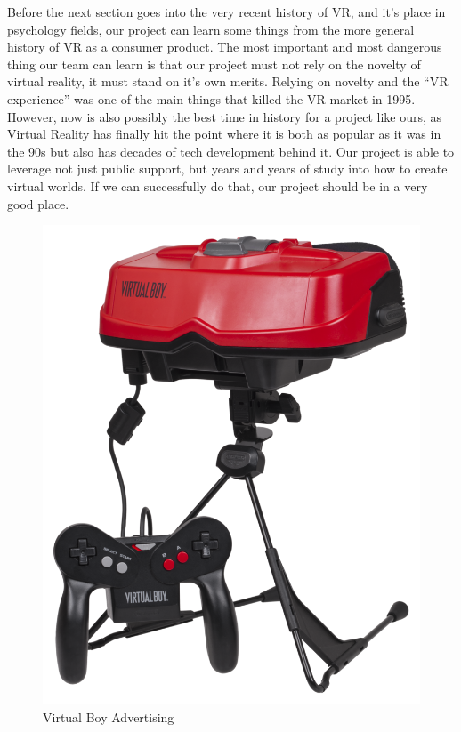 \documentclass[a4paper,10pt]{article}
\begin{document}
	Before the next section goes into the very recent history of VR, and it’s place in psychology fields, our project can learn some things from the more general history of VR as a consumer product.  The most important and most dangerous thing our team can learn is that our project must not rely on the novelty of virtual reality, it must stand on it’s own merits.  Relying on novelty and the “VR experience” was one of the main things that killed the VR market in 1995.  However, now is also possibly the best time in history for a project like ours, as Virtual Reality has finally hit the point where it is both as popular as it was in the 90s but also has decades of tech development behind it.  Our project is able to leverage not just public support, but years and years of study into how to create virtual worlds.  If we can successfully do that, our project should be in a very good place.
		\begin{figure}[H]
			\includegraphics[scale=0.7]{virtualBoy.png}
			\caption{Virtual Boy Advertising}
			\label{fig:vBoy}
		\end{figure}
\end{document}
